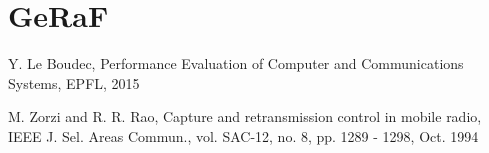 \documentclass[10pt]{article}
\begin{document}
\section*{GeRaF}


\begin{thebibliography}{10}

Y. Le Boudec, Performance Evaluation of Computer and Communications Systems, EPFL, 2015

M. Zorzi and R. R. Rao, Capture and retransmission control in
mobile radio, IEEE J. Sel. Areas Commun., vol. SAC-12, no. 8, pp.
1289 - 1298, Oct. 1994


\end{thebibliography}
\end{document}
